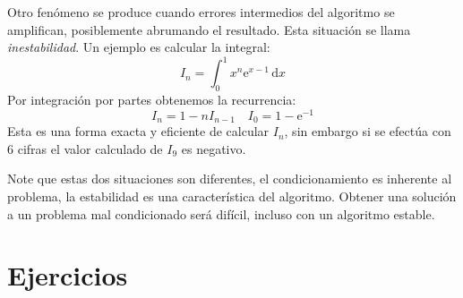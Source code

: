  Otro fenómeno se produce cuando errores intermedios del algoritmo
  se amplifican,
  posiblemente abrumando el resultado.
  Esta situación se llama \emph{inestabilidad}.
  Un ejemplo es calcular la integral:
  \begin{equation}
    \label{eq:integral-recurrencia}
    I_n
      = \int_0^1 x^n \mathrm{e}^{x - 1} \, \mathrm{d} x
  \end{equation}
  Por integración por partes obtenemos la recurrencia:
  \begin{equation*}
    I_n
      = 1 - n I_{n - 1}
      \quad I_0 = 1 - \mathrm{e^{-1}}
  \end{equation*}
  Esta es una forma exacta y eficiente de calcular \(I_n\),
  sin embargo si se efectúa con \num{6} cifras
  el valor calculado de \(I_9\) es negativo.

  Note que estas dos situaciones son diferentes,
  el condicionamiento es inherente al problema,
  la estabilidad es una característica del algoritmo.
  Obtener una solución a un problema mal condicionado será difícil,
  incluso con un algoritmo estable.

\section*{Ejercicios}
\label{sec:ejercicios-01previa}

